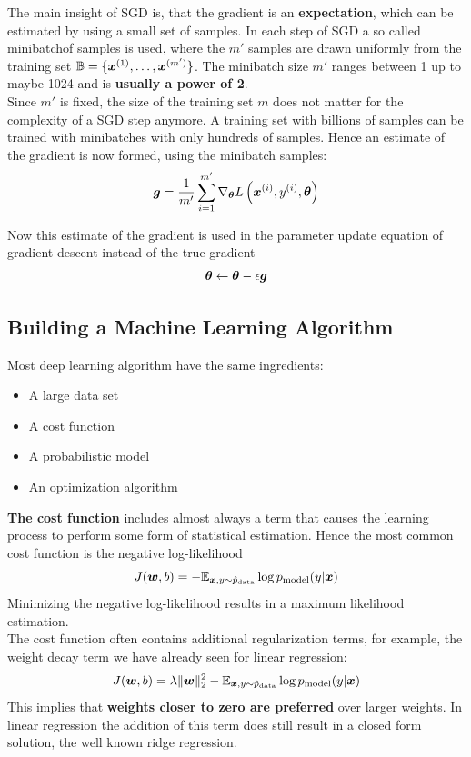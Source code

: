 \begin{multicols}{2}
	The main insight of SGD is, that the gradient is an \textbf{expectation}, which can be estimated by using a small set of samples.
	In each step of SGD a so called minibatchof samples is used, where the $m'$ samples are drawn uniformly from the training set ${\mathbb{B}}=\{{\bm{x}}^{(1)},\dots,{\bm{x}}^{(m')}  \}$. The minibatch size $m'$ ranges between 1 up to maybe 1024 and is \textbf{usually a power of 2}.\\
	Since $m'$ is fixed, the size of the training set $m$ does not matter for the complexity of a SGD step anymore.
	A training set with billions of samples can be trained with minibatches with only hundreds of samples.
	Hence an estimate of the gradient is now formed, using the minibatch samples:
	\[ \bol{g} = \frac{1}{m'}\sum_{i=1}^{m'} \nabla_\bolt L\left(\vx^{(i)},y^{(i)},\bolt\right) \]
	
	Now this estimate of the gradient is used in the parameter update equation of gradient descent instead of the true gradient
	\[ \bolt \leftarrow \bolt - \epsilon \bol{g} \]
	
	\subsection{Building a Machine Learning Algorithm}
	Most deep learning algorithm have the same ingredients:
	\begin{itemize}
		\item A large data set
		\item A cost function
		\item A probabilistic model
		\item An optimization algorithm 
	\end{itemize}

	\textbf{The cost function} includes almost always a term that causes the learning process to perform some form of statistical estimation.
	Hence the most common cost function is the negative log-likelihood
	\[ J(\bol{w},b) = - \Exp_{\vx,y\sim \hat{p}_{\text{data}}} \log p_{\text{model}}(y|\vx) \]
	Minimizing the negative log-likelihood results in a maximum likelihood estimation.\\
	
	The cost function often contains additional regularization terms, for example, the weight decay term we have already seen for linear regression:
	\[ J(\bol{w},b) = \lambda\lVert \bol{w}\rVert_2^2 - \Exp_{\vx,y\sim \hat{p}_{\text{data}}} \log p_{\text{model}}(y|\vx) \]
	This implies that \textbf{weights closer to zero are preferred} over larger weights.
	In linear regression the addition of this term does still result in a closed form solution, the well known ridge regression.
	

\end{multicols}
